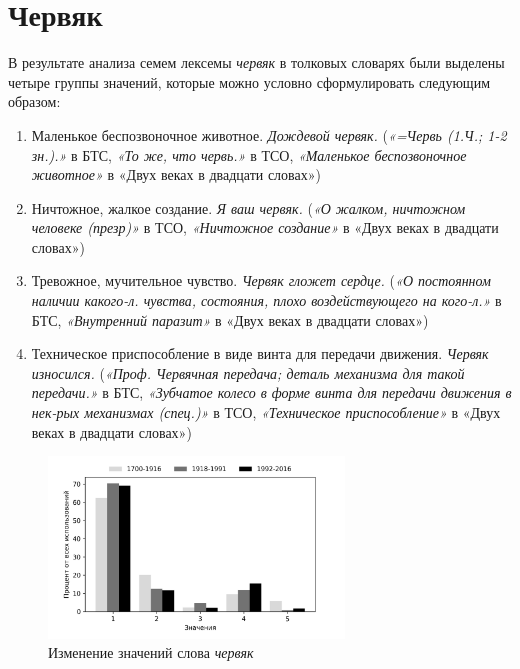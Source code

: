 \section*{Червяк}

В результате анализа семем лексемы \textit{червяк} в толковых словарях были выделены четыре группы значений,
которые можно условно сформулировать следующим образом:

\begin{enumerate}
    \item Маленькое беспозвоночное животное. \textit{Дождевой червяк.}
    (\textit{«=Червь (1.Ч.; 1-2 зн.).»} в БТС,
    \textit{«То же, что червь.»} в ТСО,
    \textit{«Маленькое беспозвоночное животное»} в «Двух веках в двадцати словах»)

    \item Ничтожное, жалкое создание. \textit{Я ваш червяк.}
    (\textit{«О жалком, ничтожном человеке (презр)»} в ТСО,
    \textit{«Ничтожное создание»} в «Двух веках в двадцати словах»)

    \item Тревожное, мучительное чувство. \textit{Червяк гложет сердце.}
    (\textit{«О постоянном наличии какого-л. чувства, состояния, плохо воздействующего на кого-л.»} в БТС,
\textit{«Внутренний паразит»} в «Двух веках в двадцати словах»)

    \item Техническое приспособление в виде винта для передачи движения. \textit{Червяк износился.}
    (\textit{«Проф. Червячная передача; деталь механизма для такой передачи.»} в БТС,
    \textit{«Зубчатое колесо в форме винта для передачи движения в нек-рых механизмах (спец.)»} в ТСО,
    \textit{«Техническое приспособление»} в «Двух веках в двадцати словах»)
\end{enumerate}

\begin{figure}[H]
	\centering
	\includegraphics[width=0.7\textwidth]{img/visualizations/chervjak_minimal}
	\caption{Изменение значений слова \textit{червяк}}
	\label{fig:Червяк}
\end{figure}

